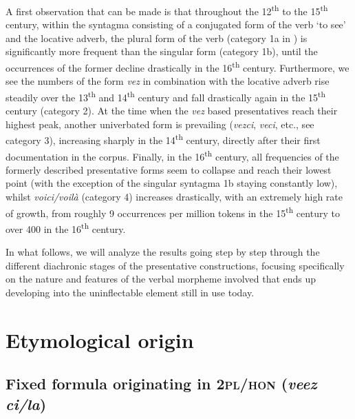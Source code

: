 \documentclass[output=paper]{langscibook}
\begin{document}
\begin{itemize}
\begin{itemize}
\begin{itemize}
\begin{itemize}
\begin{itemize}
\begin{itemize}
\begin{itemize}
A first observation that can be made is that throughout the 12\textsuperscript{th} to the 15\textsuperscript{th} century, within the syntagma consisting of a conjugated form of the verb ‘to see’ and the locative adverb, the plural form of the verb (category 1a in ) is significantly more frequent than the singular form (category 1b), until the occurrences of the former decline drastically in the 16\textsuperscript{th} century. Furthermore, we see the numbers of the form \textit{vez} in combination with the locative adverb rise steadily over the 13\textsuperscript{th} and 14\textsuperscript{th} century and fall drastically again in the 15\textsuperscript{th} century (category 2). At the time when the \textit{vez} based presentatives reach their highest peak, another univerbated form is prevailing (\textit{vezci}, \textit{veci}, etc., see category 3), increasing sharply in the 14\textsuperscript{th} century, directly after their first documentation in the corpus. Finally, in the 16\textsuperscript{th} century, all frequencies of the formerly described presentative forms seem to collapse and reach their lowest point (with the exception of the singular syntagma 1b staying constantly low), whilst \textit{voici/voilà} (category 4) increases drastically, with an extremely high rate of growth, from roughly 9 occurrences per million tokens in the 15\textsuperscript{th} century to over 400 in the 16\textsuperscript{th} century. 

In what follows, we will analyze the results going step by step through the different diachronic stages of the presentative constructions, focusing specifically on the nature and features of the verbal morpheme involved that ends up developing into the uninflectable element still in use today. 

\section{Etymological origin}
\subsection{Fixed formula originating in \textsc{2pl/hon} (\textit{veez ci/la})}


\end{itemize}
\end{itemize}
\end{itemize}
\end{itemize}
\end{itemize}
\end{itemize}
\end{itemize}
\end{document}
